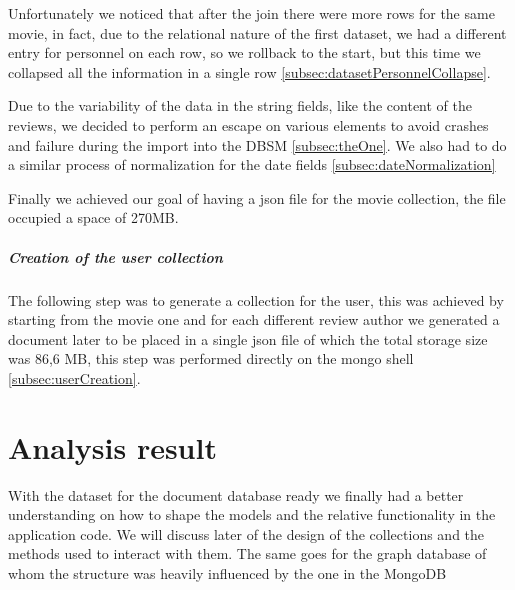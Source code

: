 Unfortunately we noticed that after the join there were more rows for the same movie, in fact, due to the relational nature of the first dataset, we had a different entry for personnel on each row, so we rollback to the start, but this time we collapsed all the information in a single row \cref{subsec:datasetPersonnelCollapse}.

Due to the variability of the data in the string fields, like the content of the reviews, we decided to perform an escape on various elements to avoid crashes and failure during the import into the DBSM \cref{subsec:theOne}. We also had to do a similar process of normalization for the date fields \cref{subsec:dateNormalization}


Finally we achieved our goal of having a json file for the movie collection, the file occupied a space of 270MB.

\subparagraph{Creation of the user collection}
The following step was to generate a collection for the user, this was achieved by starting from the movie one and for each different review author we generated a document later to be placed in a single json file of which the total storage size was 86,6 MB, this step was performed directly on the mongo shell \cref{subsec:userCreation}. 

\section{Analysis result}\label{sec:result}
With the dataset for the document database ready we finally had a better understanding on how to shape the models and the relative functionality in the application code. We will discuss later of the design of the collections and the methods used to interact with them. The same goes for the graph database of whom the structure was heavily influenced by the one in the MongoDB
%